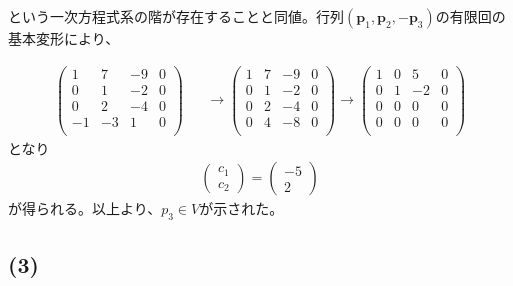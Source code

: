 \documentclass[11pt, titlepage]{jsarticle}
\begin{document}
という一次方程式系の階が存在することと同値。行列$(\boldsymbol p_1, \boldsymbol p_2, -\boldsymbol p_3)$の有限回の基本変形により、

\begin{eqnarray*}
  \left(\begin{array}{ccc|c}
    1  & 7  & -9 & 0 \\
    0  & 1  & -2 & 0 \\
    0  & 2  & -4 & 0 \\
    -1 & -3 & 1  & 0 \\
  \end{array}\right)&&
  \rightarrow\left(\begin{array}{ccc|c}
    1 & 7 & -9 & 0 \\
    0 & 1 & -2 & 0 \\
    0 & 2 & -4 & 0 \\
    0 & 4 & -8 & 0 \\
  \end{array}\right)
  \rightarrow\left(\begin{array}{ccc|c}
    1 & 0 & 5  & 0 \\
    0 & 1 & -2 & 0 \\
    0 & 0 & 0  & 0 \\
    0 & 0 & 0  & 0 \\
  \end{array}\right)
\end{eqnarray*}
となり
\begin{eqnarray*}
  \begin{pmatrix}
    c_1 \\
    c_2
  \end{pmatrix}=\begin{pmatrix}
    -5 \\
    2
  \end{pmatrix}
\end{eqnarray*}
が得られる。以上より、$p_3\in V$が示された。

\newpage
\subsection*{(3)}
\end{document}
